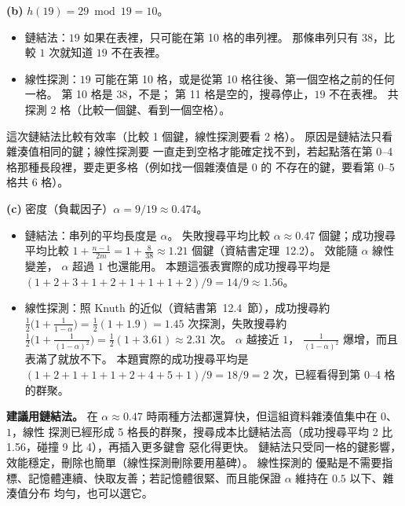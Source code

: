 \begin{pastsoln}
\textbf{(b)} $h(19) = 29 \bmod 19 = 10$。
\begin{itemize}
\item 鏈結法：$19$ 如果在表裡，只可能在第 10 格的串列裡。 那條串列只有 $38$，比較 $1$ 次就知道 $19$ 不在表裡。
\item 線性探測：$19$ 可能在第 10 格，或是從第 10 格往後、第一個空格之前的任何一格。 第 10 格是 $38$，不是；
第 11 格是空的，搜尋停止，$19$ 不在表裡。 共探測 $2$ 格（比較一個鍵、看到一個空格）。
\end{itemize}
這次鏈結法比較有效率（比較 1 個鍵，線性探測要看 2 格）。 原因是鏈結法只看雜湊值相同的鍵；線性探測要
一直走到空格才能確定找不到，若起點落在第 0--4 格那種長段裡，要走更多格（例如找一個雜湊值是 $0$ 的
不存在的鍵，要看第 0--5 格共 6 格）。

\textbf{(c)} 密度（負載因子）$\alpha = 9/19 \approx 0.474$。
\begin{itemize}
\item 鏈結法：串列的平均長度是 $\alpha$。 失敗搜尋平均比較 $\alpha \approx 0.47$ 個鍵；成功搜尋平均比較
$1 + \frac{n - 1}{2m} = 1 + \frac{8}{38} \approx 1.21$ 個鍵（資結書定理~12.2）。 效能隨 $\alpha$ 線性變差，
$\alpha$ 超過 $1$ 也還能用。 本題這張表實際的成功搜尋平均是 $(1 + 2 + 3 + 1 + 2 + 1 + 1 + 1 + 2)/9 = 14/9 \approx 1.56$。
\item 線性探測：照 Knuth 的近似（資結書第~12.4~節），成功搜尋約
$\frac{1}{2}\bigl(1 + \frac{1}{1 - \alpha}\bigr) = \frac{1}{2}(1 + 1.9) = 1.45$ 次探測，失敗搜尋約
$\frac{1}{2}\bigl(1 + \frac{1}{(1 - \alpha)^2}\bigr) = \frac{1}{2}(1 + 3.61) \approx 2.31$ 次。 $\alpha$ 越接近 $1$，
$\frac{1}{(1-\alpha)^2}$ 爆增，而且表滿了就放不下。 本題實際的成功搜尋平均是
$(1 + 2 + 1 + 1 + 1 + 2 + 4 + 5 + 1)/9 = 18/9 = 2$ 次，已經看得到第 0--4 格的群聚。
\end{itemize}
\textbf{建議用鏈結法。} 在 $\alpha \approx 0.47$ 時兩種方法都還算快，但這組資料雜湊值集中在 $0$、$1$，線性
探測已經形成 5 格長的群聚，搜尋成本比鏈結法高（成功搜尋平均 2 比 1.56，碰撞 9 比 4），再插入更多鍵會
惡化得更快。 鏈結法只受同一格的鍵影響，效能穩定，刪除也簡單（線性探測刪除要用墓碑）。 線性探測的
優點是不需要指標、記憶體連續、快取友善；若記憶體很緊、而且能保證 $\alpha$ 維持在 $0.5$ 以下、雜湊值分布
均勻，也可以選它。
\end{pastsoln}
